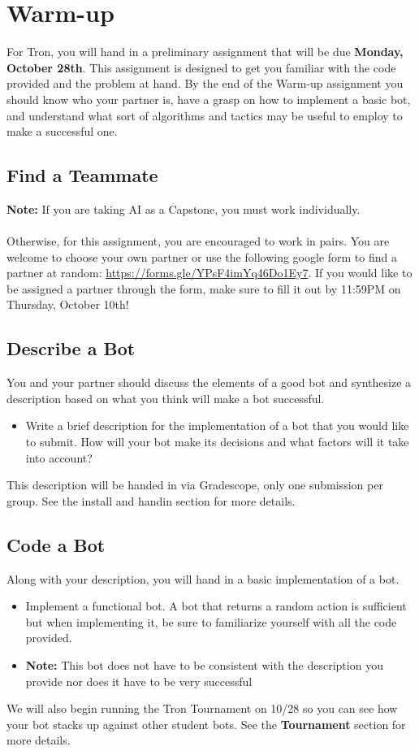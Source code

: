 \documentclass{article}
\begin{document}
\section{Warm-up}
For Tron, you will hand in a preliminary assignment that will be due \textbf{Monday, October 28th}.  This assignment is designed to get you familiar with the code provided and the problem at hand.  By the end of the Warm-up assignment you should know who your partner is, have a grasp on how to implement a basic bot, and understand what sort of algorithms and tactics may be useful to employ to make a successful one.

\subsection{Find a Teammate}
\textbf{Note:} If you are taking AI as a Capstone, you must work individually. \\\\
Otherwise, for this assignment, you are encouraged to work in pairs.  You are welcome to choose your own partner or use the following google form to find a partner at random: \url{https://forms.gle/YPsF4imYq46Do1Ey7}. If you would like to be assigned a partner through the form, make sure to fill it out by 11:59PM on Thursday, October 10th!


\subsection{Describe a Bot}
You and your partner should discuss the elements of a good bot and synthesize a description based on what you think will make a bot successful. 
\begin{itemize}
    \item Write a brief description for the implementation of a bot that you would like to submit.  How will your bot make its decisions and what factors will it take into account?
\end{itemize}
This description will be handed in via Gradescope, only one submission per group. See the install and handin section for more details.

\subsection{Code a Bot}
Along with your description, you will hand in a basic implementation of a bot.  
\begin{itemize}
    \item Implement a functional bot. A bot that returns a random action is sufficient but when implementing it, be sure to familiarize yourself with all the code provided.
    \item \textbf{Note:} This bot does not have to be consistent with the description you provide nor does it have to be very successful
\end{itemize}
We will also begin running the Tron Tournament on 10/28 so you can see how your bot stacks up against other student bots.  See the \textbf{Tournament} section for more details.
\end{document}

